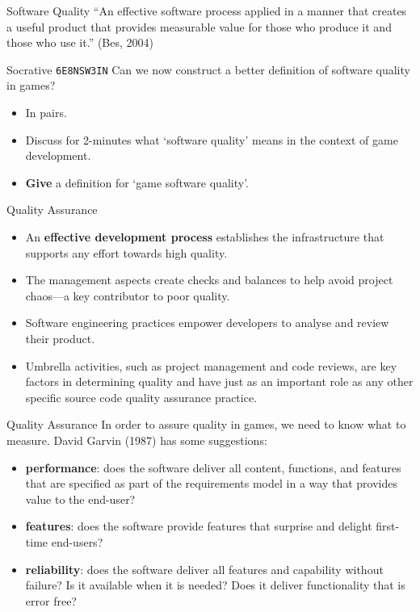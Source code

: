 \begin{frame}{Software Quality}
	``An effective software process applied in a manner that creates a useful product that provides measurable
	value for those who produce it and those who use it.''
	\vspace{2ex}
	(Bes, 2004)
\end{frame}

\begin{frame}{Socrative \texttt{6E8NSW3IN}}
	Can we now construct a better definition of software quality in games?
	
	\begin{itemize}
		\item In pairs.
		\item Discuss for 2-minutes what `software quality' means in the context of game development.
		\item \textbf{Give} a definition for `game software quality'. 
	\end{itemize}
\end{frame}

\begin{frame}{Quality Assurance}
	\begin{itemize}
		\item An \textbf{effective development process} establishes the infrastructure that supports any effort towards high quality. \pause
		\item The management aspects create checks and balances to help avoid project chaos---a key contributor to poor quality. \pause
		\item Software engineering practices empower developers to analyse and review their product. \pause
		\item Umbrella activities, such as project management and code reviews, are key factors in determining quality and have just as an
		important role as any other specific source code quality assurance practice.
	\end{itemize}
\end{frame}

\begin{frame}{Quality Assurance}
	In order to assure quality in games, we need to know what to measure. David Garvin (1987) has some suggestions: \pause

	\begin{itemize}
		\item \textbf{performance}: does the software deliver all content, functions, and features that are specified as part of the
		 requirements model in a way that provides value to the end-user? \pause
		\item \textbf{features}: does the software provide features that surprise and delight first-time end-users? \pause
		\item \textbf{reliability}: does the software deliver all features and capability without failure? Is it available when it is needed? 
		 Does it deliver functionality that is error free?
    \end{itemize}
\end{frame}


